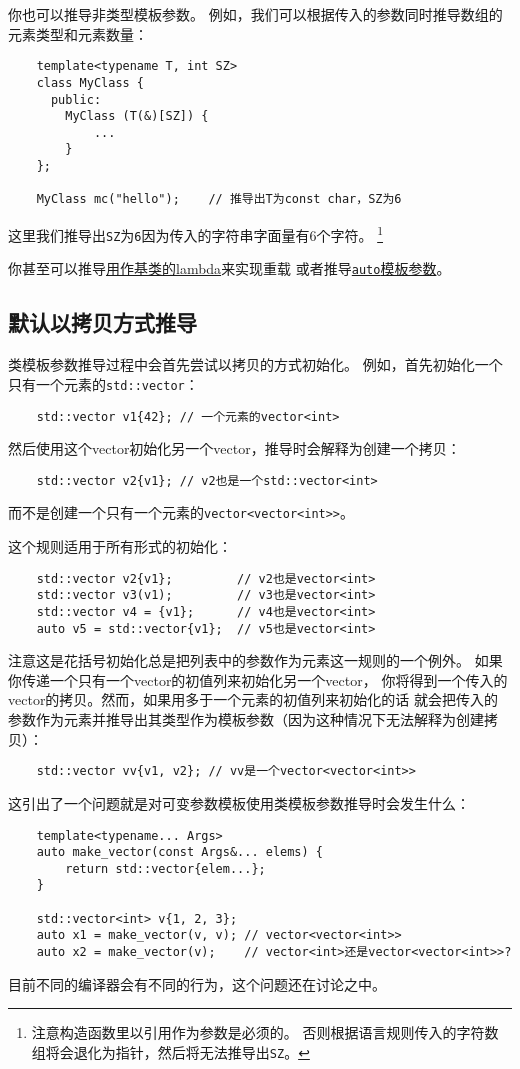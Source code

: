 你也可以推导非类型模板参数。
例如，我们可以根据传入的参数同时推导数组的元素类型和元素数量：
\begin{lstlisting}
    template<typename T, int SZ>
    class MyClass {
      public:
        MyClass (T(&)[SZ]) {
            ...
        }
    };

    MyClass mc("hello");    // 推导出T为const char，SZ为6
\end{lstlisting}
这里我们推导出\texttt{SZ}为\texttt{6}因为传入的字符串字面量有6个字符。
\footnote{注意构造函数里以引用作为参数是必须的。
否则根据语言规则传入的字符数组将会退化为指针，然后将无法推导出\texttt{SZ}。}

你甚至可以推导\hyperref[ch14.1]{用作基类的lambda}来实现重载
或者推导\hyperref[ch13.1]{\texttt{auto}模板参数}。

\subsection{默认以拷贝方式推导}\label{ch9.1.1}
类模板参数推导过程中会首先尝试以拷贝的方式初始化。
例如，首先初始化一个只有一个元素的\texttt{std::vector}：
\begin{lstlisting}
    std::vector v1{42}; // 一个元素的vector<int>
\end{lstlisting}
然后使用这个vector初始化另一个vector，推导时会解释为创建一个拷贝：
\begin{lstlisting}
    std::vector v2{v1}; // v2也是一个std::vector<int>
\end{lstlisting}
而不是创建一个只有一个元素的\texttt{vector<vector<int>>}。

这个规则适用于所有形式的初始化：
\begin{lstlisting}
    std::vector v2{v1};         // v2也是vector<int>
    std::vector v3(v1);         // v3也是vector<int>
    std::vector v4 = {v1};      // v4也是vector<int>
    auto v5 = std::vector{v1};  // v5也是vector<int>
\end{lstlisting}
注意这是花括号初始化总是把列表中的参数作为元素这一规则的一个例外。
如果你传递一个只有一个vector的初值列来初始化另一个vector，
你将得到一个传入的vector的拷贝。然而，如果用多于一个元素的初值列来初始化的话
就会把传入的参数作为元素并推导出其类型作为模板参数（因为这种情况下无法解释为创建拷贝）：
\begin{lstlisting}
    std::vector vv{v1, v2}; // vv是一个vector<vector<int>>
\end{lstlisting}
这引出了一个问题就是对可变参数模板使用类模板参数推导时会发生什么：
\begin{lstlisting}
    template<typename... Args>
    auto make_vector(const Args&... elems) {
        return std::vector{elem...};
    }

    std::vector<int> v{1, 2, 3};
    auto x1 = make_vector(v, v); // vector<vector<int>>
    auto x2 = make_vector(v);    // vector<int>还是vector<vector<int>>?
\end{lstlisting}
目前不同的编译器会有不同的行为，这个问题还在讨论之中。

